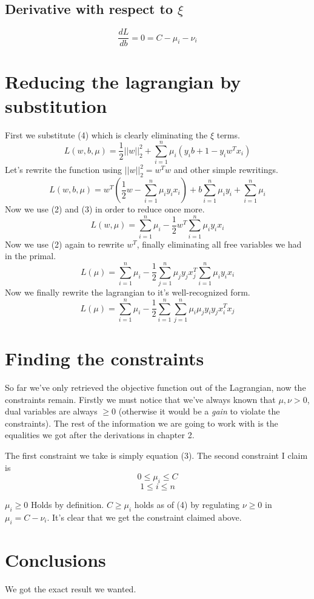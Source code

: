 \documentclass[a4paper,11pt]{article}
\begin{document}
\subsection{Derivative with respect to $\xi$}
  \begin{equation}
    \frac{dL}{db} = 0 = C - \mu_i - \nu_i
  \end{equation}

\section{Reducing the lagrangian by substitution}
First we substitute (4) which is clearly eliminating the $\xi$ terms.
\begin{equation}
  L(w, b, \mu) = \frac{1}{2} ||w||^2_2 + \sum\limits_{i=1}^n {\mu_i(y_ib + 1 - y_iw^Tx_i)}
\end{equation}
Let's rewrite the function using $ ||w||^2_2 = w^Tw $ and other simple rewritings.
\begin{equation}
  L(w, b, \mu) = w^T(\frac{1}{2}w - \sum\limits_{i=1}^n {\mu_iy_ix_i}) + b\sum\limits_{i=1}^n {\mu_iy_i} + \sum\limits_{i=1}^n {\mu_i}
\end{equation}
Now we use (2) and (3) in order to reduce once more.
\begin{equation}
  L(w, \mu) = \sum\limits_{i=1}^n {\mu_i} - \frac{1}{2} w^T \sum\limits_{i=1}^n{\mu_iy_ix_i} 
\end{equation}
Now we use (2) again to rewrite $w^T$, finally eliminating all free variables we had in the primal.
\begin{equation}
  L(\mu) = \sum\limits_{i=1}^n {\mu_i} - \frac{1}{2} \sum\limits_{j=1}^n{\mu_jy_jx_j^T} \sum\limits_{i=1}^n{\mu_iy_ix_i} 
\end{equation}
Now we finally rewrite the lagrangian to it's well-recognized form.
\begin{equation}
  L(\mu) = \sum\limits_{i=1}^n {\mu_i} - \frac{1}{2} \sum\limits_{i=1}^n \sum\limits_{j=1}^n{\mu_i\mu_jy_iy_jx_i^Tx_j}
\end{equation}
\section{Finding the constraints}
So far we've only retrieved the objective function out of the Lagrangian, now the constraints remain.
Firstly we must notice that we've always known that $ \mu,\nu > 0 $,
dual variables are always $\ge 0$ (otherwise it would be
a \textit{gain} to violate the constraints).
The rest of the information we are going to work with is the equalities
we got after the derivations in chapter 2.


The first constraint we take is simply equation (3). The second constraint I claim is
$$ 0 \le \mu_i \le C $$
$$ 1 \le     i \le n $$ 

$\mu_i \ge 0$ Holds by definition. $C \ge \mu_i$ holds as of (4) by regulating $\nu \ge 0$
in $\mu_i = C - \nu_i$. It's clear that we get the constraint claimed above.

\section{Conclusions}
We got the exact result we wanted.
\end{document}
